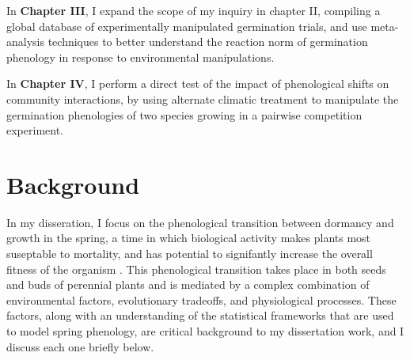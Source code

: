 \documentclass[12pt]{article}\usepackage[]{graphicx}\usepackage[]{color}
\begin{document}
\par In \textbf{Chapter III}, I expand the scope of my inquiry in chapter II, compiling a global database of experimentally manipulated germination trials, and use meta-analysis techniques to better understand the reaction norm of germination phenology in response to environmental manipulations.
\par In \textbf{Chapter IV}, I perform a direct test of the impact of phenological shifts on community interactions, by using alternate climatic treatment to manipulate the germination phenologies of two species growing in a pairwise competition experiment.

\section*{Background}
\indent\indent In my disseration, I focus on the phenological transition between dormancy and growth in the spring, a time in which biological activity makes plants most suseptable to mortality, and has potential to signifantly increase the overall fitness of the organism \citep{Rathcke1985}. This phenological transition takes place in both seeds and buds of perennial plants and is mediated by a complex combination of environmental factors, evolutionary tradeoffs, and physiological processes. These factors, along with an understanding of the statistical frameworks that are used to model spring phenology, are critical background to my dissertation work, and I discuss each one briefly below.\\
\end{document}
